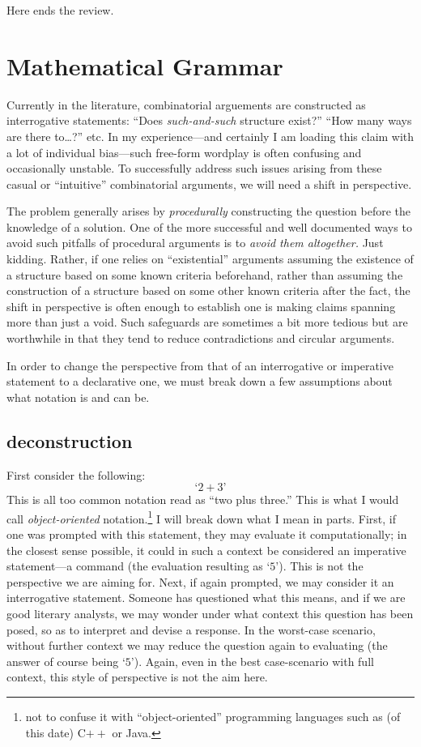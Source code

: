 \documentclass[twoside]{book}
\begin{document}
Here ends the review.

\chapter{Mathematical Grammar}

Currently in the literature, combinatorial arguements are constructed as interrogative statements:
``Does \emph{such-and-such} structure exist?'' ``How many ways are there to\ldots?'' etc.  In my
experience---and certainly I am loading this claim with a lot of individual bias---such free-form wordplay is often
confusing and occasionally unstable.  To successfully address such issues arising from these casual or ``intuitive''
combinatorial arguments, we will need a shift in perspective.

The problem generally arises by \emph{procedurally} constructing the question before the knowledge of a solution.
One of the more successful and well documented ways to avoid such pitfalls of procedural arguments is to
\emph{avoid them altogether.} Just kidding.  Rather, if one relies on ``existential'' arguments assuming the existence
of a structure based on some known criteria beforehand, rather than assuming the construction of a structure based on
some other known criteria after the fact, the shift in perspective is often enough to establish one is making claims
spanning more than just a void.  Such safeguards are sometimes a bit more tedious but are worthwhile in that they
tend to reduce contradictions and circular arguments.

In order to change the perspective from that of an interrogative or imperative statement to a declarative one,
we must break down a few assumptions about what notation is and can be.

\section{deconstruction}

First consider the following:
$$  \mbox{`}2+3\mbox{'} $$
This is all too common notation read as ``two plus three.''  This is what I would call \emph{object-oriented}
notation.\footnote{not to confuse it with ``object-oriented'' programming languages such as (of this date) C$ ++ $
or Java.}  I will break down what I mean in parts.  First, if one was prompted with this statement, they may
evaluate it computationally; in the closest sense possible, it could in such a context be considered an imperative
statement---a command (the evaluation resulting as `$ 5 $').  This is not the perspective we are aiming for.
Next, if again prompted, we may consider it an interrogative statement.  Someone has questioned what this means,
and if we are good literary analysts, we may wonder under what context this question has been posed, so as to
interpret and devise a response.  In the worst-case scenario, without further context we may reduce the question
again to evaluating (the answer of course being `$ 5 $').  Again, even in the best case-scenario with full context,
this style of perspective is not the aim here.
\end{document}
